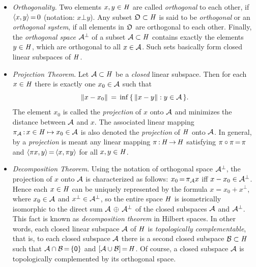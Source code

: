 \documentclass[11pt,twoside]{article}
\begin{document}
\begin{itemize}[leftmargin=15pt,itemsep=6pt]
\item[1.] \textit{Orthogonality}.
Two elements $x,y \in \mathit{H}$ are called \textit{orthogonal} to each other,
if $\langle x,y \rangle {\,=\,} 0$ (notation: $x \bot y$).
Any subset $\mathfrak{O} \subset \mathit{H}$ is said to be \textit{orthogonal}
or an \textit{orthogonal system},
if all elements in $\mathfrak{O}$ are orthogonal to each other.
Finally,
the \textit{orthogonal space} $\mathcal{A}^{\bot}$
of a subset $\mathcal{A} \subset \mathit{H}$ contains exactly the elements $y \in \mathit{H}$,
which are orthogonal to all $x \in \mathcal{A}$.
Such sets basically form closed linear subspaces of $\mathit{H}$.

\item[2.] \textit{Projection Theorem}.
Let $\mathcal{A} \subset \mathit{H}$ be a \textit{closed} linear subspace.
Then for each $x \in \mathit{H}$ there is exactly one $x_0 \in \mathcal{A}$
such that
\[
\left\lVert  x - x_0  \right\rVert \,=\, \inf \, \{ \, \left\lVert x-y \right\rVert: y \in \mathcal{A} \,\}.
\]
The element $x_0$ is called the \textit{projection} of $x$ onto $\mathcal{A}$
and minimizes the distance between $\mathcal{A}$ and $x$.
The associated linear mapping
$\pi_{\mathcal{A}}{\,:\,}x \in \mathit{H} \mapsto x_0 \in \mathcal{A}$
is also denoted the \textit{projection} of $\mathit{H}$ onto $\mathcal{A}$.
In general,
by a \textit{projection} is meant
any linear mapping $\pi{\,:\,}\mathit{H} {\,\to\,} \mathit{H}$ satisfying
$\pi \circ \pi {\,=\,} \pi$ and
$\langle \pi x,y \rangle {\,=\,} \langle x,\pi y \rangle$ for all $x,y \in \mathit{H}$.

\item[3.] \textit{Decomposition Theorem}.
Using the notation of orthogonal space $\mathcal{A}^{\bot}$,
the projection of $x$ onto $\mathcal{A}$ is characterized as follows:
$x_0 {\,=\,} \pi_{\mathcal{A}} x$ iff $x-x_0 \in \mathcal{A}^{\bot}$.
Hence each $x \in \mathit{H}$ can be uniquely represented by the formula
$x = x_0 + x^{\bot}$,
where $x_0 \in \mathcal{A}$ and $x^{\bot} \in \mathcal{A}^{\bot}$,
so the entire space $\mathit{H}$ is isometrically isomorphic
to the direct sum $\mathcal{A} \, \oplus \, \mathcal{A}^{\bot}$
of the closed subspaces $\mathcal{A}$ and $\mathcal{A}^{\bot}$.
This fact is known as \textit{decomposition theorem} in Hilbert spaces.
In other words,
each closed linear subspace $\mathcal{A}$ of $\mathit{H}$
is \textit{topologically complementable},
that is,
to each closed subspace $\mathcal{A}$
there is a second closed subspace $\mathcal{B} \subset \mathit{H}$
such that $\mathcal{A} \cap \mathcal{B} {\,=\,} \{{\mathsf{0}}\}$ and $[\mathcal{A} \cup \mathcal{B}] {\,=\,} \mathit{H}$.
Of course,
a closed subspace ${\mathcal{A}}$ is topologically complemented
by its orthogonal space. %


\end{itemize}
\end{document}
